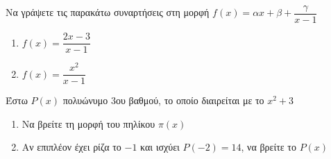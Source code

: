 \documentclass{presentation}
\begin{document}
\begin{askisi}
  Να γράψετε τις παρακάτω συναρτήσεις στη μορφή $f(x)=αx+β+\dfrac{γ}{x-1}$
  \begin{enumerate}
    \item<1-> $f(x)=\dfrac{2x-3}{x-1}$
    \item<2-> $f(x)=\dfrac{x^2}{x-1}$
  \end{enumerate}

\end{askisi}

\begin{askisi}
  Έστω $P(x)$ πολυώνυμο 3ου βαθμού, το οποίο διαιρείται με το $x^2+3$
  \begin{enumerate}
    \item<1-> Να βρείτε τη μορφή του πηλίκου $π(x)$
    \item<2-> Αν επιπλέον έχει ρίζα το $-1$ και ισχύει $P(-2)=14$, να βρείτε το $P(x)$
  \end{enumerate}


\end{askisi}


%
%
%
%
%
%
%
\end{document}
